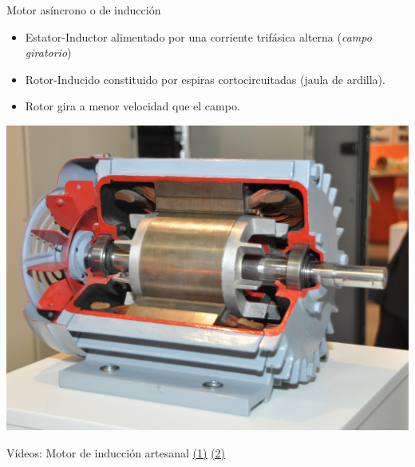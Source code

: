 \documentclass[xcolor={usenames,svgnames,dvipsnames}]{beamer}
\begin{document}
\begin{frame}[label={sec:orgdb691ba}]{Motor asíncrono o de inducción}
\begin{itemize}
\item \alert{Estator-Inductor} alimentado por una \alert{corriente trifásica alterna} (\emph{campo giratorio})

\item \alert{Rotor-Inducido} constituido por espiras cortocircuitadas (\alert{jaula de ardilla}).

\item Rotor gira a menor velocidad que el campo.
\end{itemize}

\begin{center}
\includegraphics[height=0.5\textheight]{../figs/Seccion_Motor.jpeg}
\end{center}

Vídeos: Motor de inducción artesanal \href{http://www.youtube.com/watch?v=ZRGlAu0uCHY\&feature=related}{(1)} \href{http://www.youtube.com/watch?v=P-eTLmJC2cQ}{(2)}
\end{frame}
\end{document}
